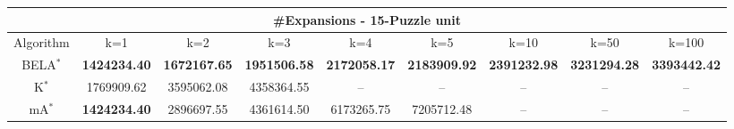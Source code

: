 \begin{tabular}{c|cccccccc}\toprule
\multicolumn{9}{c}{#Expansions - 15-Puzzle unit}\\ \midrule
Algorithm & k=1 & k=2 & k=3 & k=4 & k=5 & k=10 & k=50 & k=100 \\ \midrule
BELA$^*$ & \textbf{1424234.40} & \textbf{1672167.65} & \textbf{1951506.58} & \textbf{2172058.17} & \textbf{2183909.92} & \textbf{2391232.98} & \textbf{3231294.28} & \textbf{3393442.42} \\
K$^*$ & 1769909.62 & 3595062.08 & 4358364.55 & -- & -- & -- & -- & -- \\
mA$^*$ & \textbf{1424234.40} & 2896697.55 & 4361614.50 & 6173265.75 & 7205712.48 & -- & -- & -- \\ \bottomrule 
\end{tabular}
